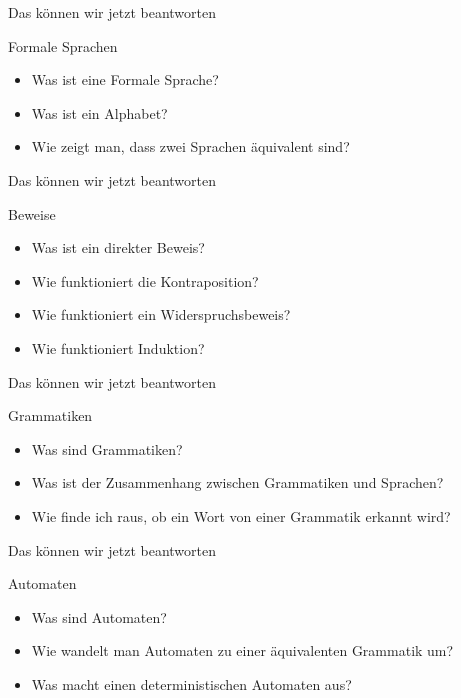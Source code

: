 \documentclass[10pt]{beamer}
\begin{document}
\begin{frame}[fragile]{Das können wir jetzt beantworten}
    \begin{alertblock}{Formale Sprachen}
    \begin{itemize}
        \item Was ist eine Formale Sprache?
        \item Was ist ein Alphabet?
        \item Wie zeigt man, dass zwei Sprachen äquivalent sind?
    \end{itemize}
    \end{alertblock}
\end{frame}

\begin{frame}[fragile]{Das können wir jetzt beantworten}
    \begin{alertblock}{Beweise}
    \begin{itemize}
        \item Was ist ein direkter Beweis?
        \item Wie funktioniert die Kontraposition?
        \item Wie funktioniert ein Widerspruchsbeweis?
        \item Wie funktioniert Induktion?
    \end{itemize}
    \end{alertblock}
\end{frame}

\begin{frame}[fragile]{Das können wir jetzt beantworten}
    \begin{alertblock}{Grammatiken}
    \begin{itemize}
        \item Was sind Grammatiken?
        \item Was ist der Zusammenhang zwischen Grammatiken und Sprachen?
        \item Wie finde ich raus, ob ein Wort von einer Grammatik erkannt wird?
    \end{itemize}
    \end{alertblock}
\end{frame}

\begin{frame}[fragile]{Das können wir jetzt beantworten}
    \begin{alertblock}{Automaten}
    \begin{itemize}
        \item Was sind Automaten?
        \item Wie wandelt man Automaten zu einer äquivalenten Grammatik um?
        \item Was macht einen deterministischen Automaten aus?
    \end{itemize}
    \end{alertblock}
\end{frame}
\end{document}
